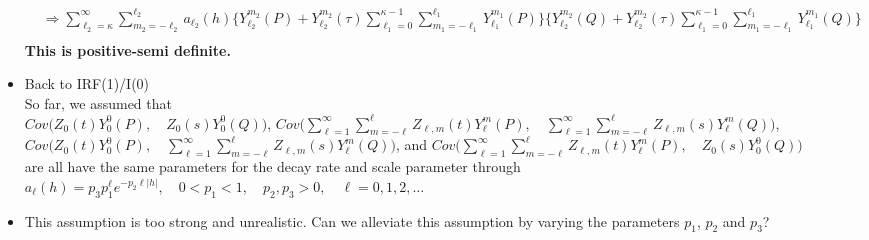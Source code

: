 \documentclass[11pt]{article}
\begin{document}
\begin{itemize}
{\begin{align*}
&\Rightarrow \sum_{\ell_2=\kappa}^{\infty}  \sum_{m_2=-\ell_2}^{\ell_2} a_{\ell_2}(h) \biggl \{ Y_{\ell_2}^{m_2}(P) +  Y_{\ell_2}^{m_2}(\tau) \sum_{\ell_1=0}^{\kappa-1} \sum_{m_1=-\ell_1}^{\ell_1} Y_{\ell_1}^{m_1}(P) \biggl \} \biggl \{ Y_{\ell_2}^{m_2}(Q) +  Y_{\ell_2}^{m_2}(\tau) \sum_{\ell_1=0}^{\kappa-1} \sum_{m_1=-\ell_1}^{\ell_1} Y_{\ell_1}^{m_1}(Q) \biggl \}\\
\end{align*}
{\color{red} \textbf{This is positive-semi definite.}}\\
}

\pagebreak

\item 
Back to IRF(1)/I(0)\\
So far, we assumed that\\ 
$Cov\biggl(Z_0(t)Y_0^0(P),\quad Z_0(s) Y_0^0(Q)\biggl)$, $Cov\biggl(\sum_{\ell=1}^{\infty} \sum_{m=-\ell}^{\ell} Z_{\ell,m}(t) Y_{\ell}^{m}(P),\quad \sum_{\ell=1}^{\infty} \sum_{m=-\ell}^{\ell} Z_{\ell,m}(s) Y_{\ell}^{m}(Q)\biggl)$,\\
$Cov\biggl(Z_0(t)Y_0^0(P),\quad \sum_{\ell=1}^{\infty} \sum_{m=-\ell}^{\ell} Z_{\ell,m}(s) Y_{\ell}^{m}(Q)\biggl)$, and $Cov\biggl(\sum_{\ell=1}^{\infty} \sum_{m=-\ell}^{\ell} Z_{\ell,m}(t) Y_{\ell}^{m}(P),\quad Z_{0}(s) Y_{0}^{0}(Q) \biggl)$\\
are all have the same parameters for the decay rate and scale parameter through $a_\ell(h)=p_3 p_1^\ell e^{-p_2 \ell |h|}, \quad 0<p_1<1, \quad p_2,p_3>0, \quad \ell=0,1,2,\dots$\\


\item This assumption is too strong and unrealistic. Can we alleviate this assumption by varying the parameters $p_1$, $p_2$ and $p_3$?\\


\end{itemize}
\end{document}
